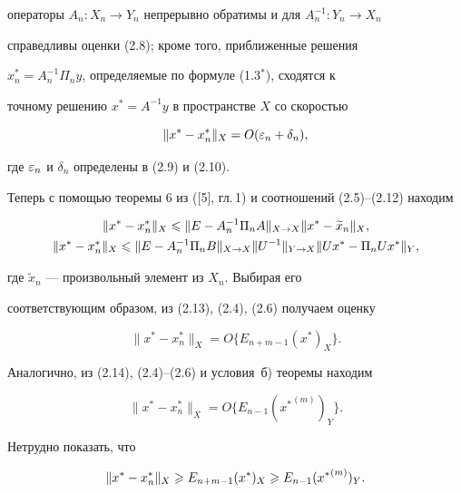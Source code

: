 операторы $A_n:X_n\to Y_n$ непрерывно обратимы и для $A_n^{-1}:Y_n\to X_n$


справедливы оценки (2.8); кроме того, приближенные решения


$x_n^*=A_n^{-1}\Pi_n y$, определяемые по формуле (1.3$^*$), сходятся к 


точному решению $x^*=A^{-1}y$ в пространстве $X$ со скоростью


\begin{equation}


\|x^*-x^*_n\|_X = O(\ve_n + \delta_n),


\end{equation}


где $\varepsilon_n$ и $\delta_n$ определены в (2.9) и (2.10).





Теперь с помощью теоремы 6 из ([5], гл.\,1) и соотношений (2.5)--(2.12) находим


\begin{gather}


\|x^*-x^*_n\|_X\lea \|E - A_n^{-1}\Pi_n A\|_{X\to X}


\|x^* - \widetilde{x}_n\|_X,\\


%


\|x^*-x^*_n\|_X \lea \|E- A_n^{-1}\Pi_n B\|_{X\to X} \|U^{-1}\|_{Y\to X}


\|Ux^*-\Pi_n U x^*\|_Y,


\end{gather}


где $\widetilde{x}_n$ --- произвольный элемент из $X_n$. Выбирая его 


соответствующим образом, из (2.13), (2.4), (2.6) получаем оценку


\begin{equation}


\|x^*-x^*_n\|_X = O\{E_{n+m-1}(x^*)_X\}.


\end{equation}


Аналогично, из (2.14), (2.4)--(2.6) и условия~б) теоремы находим


\begin{equation}


\|x^*-x^*_n\|_X = O\{E_{n-1}({x^*}^{(m)})_Y\}.


\end{equation}


Нетрудно показать, что


\begin{equation}


\|x^*-x^*_n\|_X \gea E_{n+m-1}(x^*)_X \gea E_{n-1}({x^*}^{(m)})_Y.


\end{equation}


